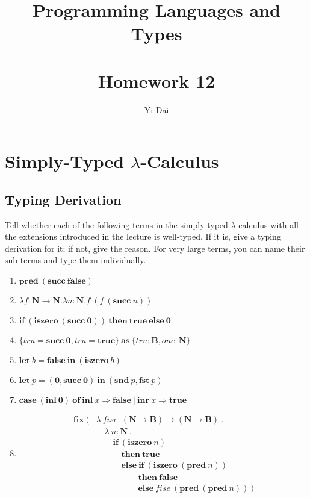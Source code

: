 \documentclass[a4paper,12pt]{article}
\title{
 Programming Languages and Types \\~\\
 \textbf{Homework 12}
}
\author{
 Yi Dai
}
\newcommand{\NatT}{\textbf{N}}
\newcommand{\rarr}{\rightarrow}
\newcommand{\lamb}{\lambda}
\newcommand{\zero}{\textbf{0}}
\renewcommand{\succ}{\textbf{succ}}
\newcommand{\pred}{\textbf{pred}}
\newcommand{\isze}{\textbf{iszero}}
\newcommand{\BlnT}{\textbf{B}}
\newcommand{\true}{\textbf{true}}
\newcommand{\fals}{\textbf{false}}
\newcommand{\ifkw}{\textbf{if}}
\newcommand{\thkw}{\textbf{then}}
\newcommand{\elkw}{\textbf{else}}
\newcommand{\askw}{\textbf{as}}
\newcommand{\letk}{\textbf{let}}
\newcommand{\inkw}{\textbf{in}}
\newcommand{\fstp}{\textbf{fst}}
\newcommand{\sndp}{\textbf{snd}}
\newcommand{\inlh}{\textbf{inl}}
\newcommand{\inrh}{\textbf{inr}}
\newcommand{\case}{\textbf{case}}
\newcommand{\ofkw}{\textbf{of}}
\newcommand{\Rarr}{\Rightarrow}
\newcommand{\fixp}{\textbf{fix}}
\begin{document}
\maketitle

\section{Simply-Typed $\lambda$-Calculus}

\subsection{Typing Derivation}

Tell whether each of the following terms in the simply-typed $\lamb$-calculus with all the extensions 
introduced in the lecture is well-typed.  If it is, give a typing derivation for it; if not, give the
reason.  For very large terms, you can name their sub-terms and type them individually.

\begin{enumerate}
 \item $\pred\ (\succ\ \fals)$
 \item $\lamb f : \NatT \rarr \NatT . \lamb n : \NatT . f\ (f\ (\succ\ n))$
 \item $\ifkw\ (\isze\ (\succ\ \zero))\ \thkw\ \true\ \elkw\ \zero$
 \item $\{tru = \succ\ \zero, tru = \true\}\ \askw\ \{tru : \BlnT, one : \NatT\}$
 \item $\letk\ b = \fals\ \inkw\ (\isze\ b)$
 \item $\letk\ p = (\zero, \succ\ \zero)\ \inkw\ (\sndp\ p, \fstp\ p)$
 \item $\case\ (\inlh\ \zero)\ \ofkw\ \inlh\ x \Rarr \fals\ |\ \inrh\ x \Rarr \true$
 \item
  \begin{align*}
   \fixp\ (& \lamb\ fise : (\NatT \rarr \BlnT) \rarr (\NatT \rarr \BlnT)\ . \\
           & \quad \lamb\ n : \NatT\ . \\
           & \quad \quad \ifkw\ (\isze\ n) \\
           & \quad \quad \quad \thkw\ \true \\
           & \quad \quad \quad \elkw\ \ifkw\ (\isze\ (\pred\ n)) \\
           & \quad \quad \quad \quad \quad \thkw\ \fals \\
           & \quad \quad \quad \quad \quad \elkw\ fise\ (\pred\ (\pred\ n))\ )
  \end{align*}
\end{enumerate}
\end{document}
